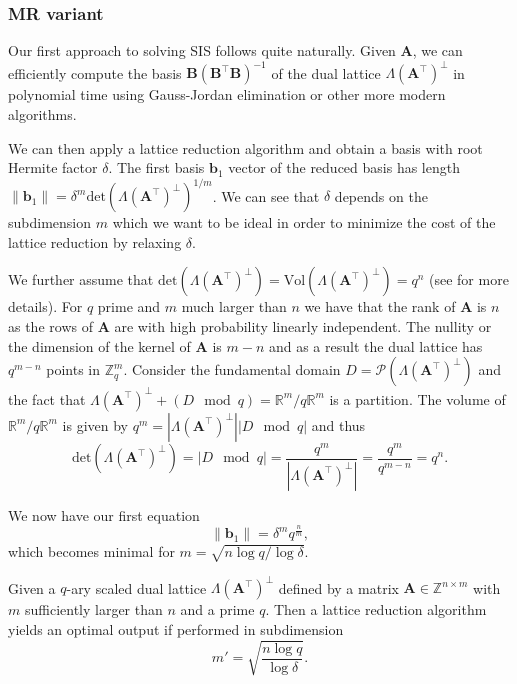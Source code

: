 \subsubsection{MR variant \cite{MR09}} \label{sec:mr-variant}
Our first approach to solving SIS follows quite naturally. Given $\mathbf{A}$, we can efficiently compute the basis $\mathbf{B} (\mathbf{B}^\intercal \mathbf{B})^{-1}$ of the dual lattice $\Lambda(\mathbf{A}^\intercal)^{\perp}$ in polynomial time using Gauss-Jordan elimination or other more modern algorithms.

We can then apply a lattice reduction algorithm and obtain a basis with root Hermite factor $\delta$. The first basis $\mathbf{b}_1$ vector of the reduced basis has length $\|\mathbf{b}_1\| = \delta^m \text{det}(\Lambda(\mathbf{A}^\intercal)^{\perp})^{1/m}$. We can see that $\delta$ depends on the subdimension $m$ which we want to be ideal in order to minimize the cost of the lattice reduction by relaxing $\delta$.

We further assume that $\text{det}(\Lambda(\mathbf{A}^\intercal)^{\perp}) = \text{Vol}(\Lambda(\mathbf{A}^\intercal)^{\perp}) = q^n$ (see \cite{MR09} for more details). For $q$ prime and $m$ much larger than $n$ we have that the rank of $\mathbf{A}$ is $n$ as the rows of $\mathbf{A}$ are with high probability linearly independent. The nullity or the dimension of the kernel of $\mathbf{A}$ is $m-n$ and as a result the dual lattice has $q^{m-n}$ points in $\mathbb{Z}_q^m$. Consider the fundamental domain $D = \mathcal{P}(\Lambda(\mathbf{A}^\intercal)^{\perp})$ and the fact that $\Lambda(\mathbf{A}^\intercal)^{\perp} + (D \mod q) = \mathbb{R}^m/q\mathbb{R}^m$ is a partition. The volume of $\mathbb{R}^m/q\mathbb{R}^m$ is given by $q^m =|\Lambda(\mathbf{A}^\intercal)^{\perp}||D \mod q|$ and thus
\begin{equation}\label{eq:det-MR}
  \text{det}(\Lambda(\mathbf{A}^\intercal)^{\perp}) = |D \mod q| = \frac{q^m}{|\Lambda(\mathbf{A}^\intercal)^{\perp}|} = \frac{q^{m}}{q^{m-n}} = q^n.
\end{equation} %


We now have our first equation
\begin{equation}\label{eq:mr-delta}
  \|\mathbf{b}_1\| = \delta^m q^{\frac{n}{m}},
\end{equation}
which becomes minimal for $m = \sqrt{n \log q / \log \delta}$.
\begin{theorem}
  Given a $q$-ary scaled dual lattice  $\Lambda(\mathbf{A}^\intercal)^{\perp}$ defined by a matrix $\mathbf{A} \in \mathbb{Z}^{n \times m}$ with $m$ sufficiently larger than $n$ and a prime $q$. Then a lattice reduction algorithm yields an optimal output if performed in subdimension
  \begin{equation}
    m' = \sqrt{\frac{n \log q}{\log \delta}}. \label{eq:mr-m}
  \end{equation}
\end{theorem}

